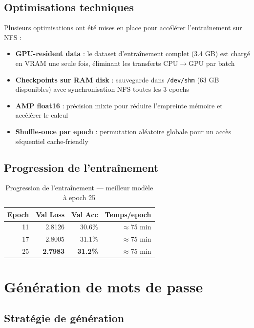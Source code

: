 \documentclass[12pt,a4paper]{article}
\begin{document}
\subsection{Optimisations techniques}

Plusieurs optimisations ont été mises en place pour accélérer l'entraînement sur NFS :

\begin{itemize}
    \item \textbf{GPU-resident data} : le dataset d'entraînement complet (3.4 GB) est chargé en VRAM une seule fois, éliminant les transferts CPU$\rightarrow$GPU par batch
    \item \textbf{Checkpoints sur RAM disk} : sauvegarde dans \texttt{/dev/shm} (63 GB disponibles) avec synchronisation NFS toutes les 3 epochs
    \item \textbf{AMP float16} : précision mixte pour réduire l'empreinte mémoire et accélérer le calcul
    \item \textbf{Shuffle-once par epoch} : permutation aléatoire globale pour un accès séquentiel cache-friendly
\end{itemize}

\subsection{Progression de l'entraînement}

\begin{table}[H]
\centering
\begin{tabular}{rrrr}
\toprule
\textbf{Epoch} & \textbf{Val Loss} & \textbf{Val Acc} & \textbf{Temps/epoch} \\
\midrule
11 & 2.8126 & 30.6\% & $\approx$75 min \\
17 & 2.8005 & 31.1\% & $\approx$75 min \\
25 & \textbf{2.7983} & \textbf{31.2\%} & $\approx$75 min \\
\bottomrule
\end{tabular}
\caption{Progression de l'entraînement — meilleur modèle à epoch 25}
\end{table}

\section{Génération de mots de passe}

\subsection{Stratégie de génération}
\end{document}
